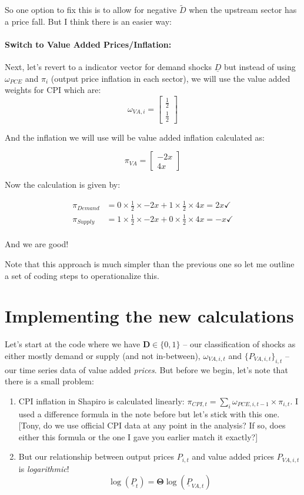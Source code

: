 \documentclass[12pt,english]{article}
\begin{document}
So one option to fix this is to allow for negative $\tilde{D}$ when the upstream sector has a price fall. But I think there is an easier way:

\paragraph{Switch to Value Added Prices/Inflation:} Next, let's revert to a indicator vector for demand shocks $\underline{D}$ but instead of using $\omega_{PCE}$ and $\pi_i$ (output price inflation in each sector), we will use the value added weights for CPI which are:
\[
	\omega_{VA,i} = \begin{bmatrix}
		\frac{1}{2}\\\frac{1}{2}
	\end{bmatrix}
\]

And the inflation we will use will be value added inflation calculated as:

\[
	\pi_{VA} = \begin{bmatrix}
		-2x\\4x
	\end{bmatrix}
\]

Now the calculation is given by:

\begin{align*}
	\pi_{Demand} &= 0 \times \frac{1}{2} \times -2x + 1 \times \frac{1}{2} \times 4x = 2x\checkmark\\
	\pi_{Supply} &= 1 \times \frac{1}{2} \times -2x + 0 \times \frac{1}{2} \times 4x = -x \checkmark\\	
\end{align*}

And we are good! 

Note that this approach is much simpler than the previous one so let me outline a set of coding steps to operationalize this.

\section{Implementing the new calculations}

Let's start at the code where we have $\mathbold{D}\in \{0,1\}$ -- our classification of shocks as either mostly demand or supply (and not in-between), $\omega_{VA,i,t}$ and $\{P_{VA,i,t}\}_{i,t}$ -- our time series data of value added \emph{prices}. But before we begin, let's note that there is a small problem:

\begin{enumerate}
	\item CPI inflation in Shapiro is calculated linearly: $\pi_{CPI,t} = \sum_i \omega_{PCE,i,t-1} \times \pi_{i,t}$. I used a difference formula in the note before but let's stick with this one. [Tony, do we use official CPI data at any point in the analysis? If so, does either this formula or the one I gave you earlier match it exactly?]
	\item But our relationship between output prices $P_{i,t}$ and value added prices $P_{VA,i,t}$ is \emph{logarithmic}!
	\[
		\log(\underline{P}_t) = \mathbold{\Theta} \log(\underline{P}_{VA,t})
	\]
\end{enumerate}
\end{document}
